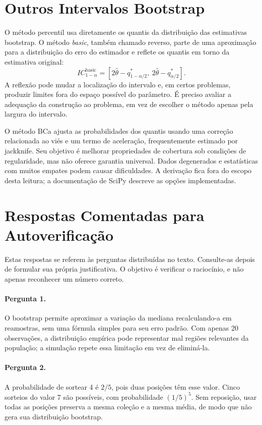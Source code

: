 \documentclass[12pt,a4paper]{article}
\begin{document}
\section{Outros Intervalos Bootstrap}
\label{ap:ic}
O método percentil usa diretamente os quantis da distribuição das estimativas bootstrap. O método \emph{basic}, também chamado reverso, parte de uma aproximação para a distribuição do erro do estimador e reflete os quantis em torno da estimativa original:
\[
IC_{1-\alpha}^{\mathrm{basic}}=
[2\hat\theta-q_{1-\alpha/2}^*,\ 2\hat\theta-q_{\alpha/2}^*].
\]
A reflexão pode mudar a localização do intervalo e, em certos problemas, produzir limites fora do espaço possível do parâmetro. É preciso avaliar a adequação da construção ao problema, em vez de escolher o método apenas pela largura do intervalo.

O método BCa ajusta as probabilidades dos quantis usando uma correção relacionada ao viés e um termo de aceleração, frequentemente estimado por jackknife. Seu objetivo é melhorar propriedades de cobertura sob condições de regularidade, mas não oferece garantia universal. Dados degenerados e estatísticas com muitos empates podem causar dificuldades. A derivação fica fora do escopo desta leitura; a documentação de SciPy descreve as opções implementadas.

\section{Respostas Comentadas para Autoverificação}
\label{ap:respostas}
Estas respostas se referem às perguntas distribuídas no texto. Consulte-as depois de formular sua própria justificativa. O objetivo é verificar o raciocínio, e não apenas reconhecer um número correto.

\paragraph{Pergunta 1.} O bootstrap permite aproximar a variação da mediana recalculando-a em reamostras, sem uma fórmula simples para seu erro padrão. Com apenas 20 observações, a distribuição empírica pode representar mal regiões relevantes da população; a simulação repete essa limitação em vez de eliminá-la.

\paragraph{Pergunta 2.} A probabilidade de sortear 4 é $2/5$, pois duas posições têm esse valor. Cinco sorteios do valor 7 são possíveis, com probabilidade $(1/5)^5$. Sem reposição, usar todas as posições preserva a mesma coleção e a mesma média, de modo que não gera sua distribuição bootstrap.
\end{document}
